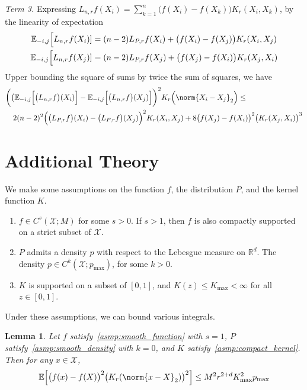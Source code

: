 \documentclass{article}
\newcommand{\Reals}{\mathbb{R}}
\newcommand{\1}{\mathbf{1}}
\newcommand{\Xset}{\mathcal{X}}
\newcommand{\Ebb}{\mathbb{E}}
\theoremstyle{alden}
\theoremstyle{aldenthm}
\newtheorem{lemma}{Lemma}
\theoremstyle{definition}
\theoremstyle{remark}
\begin{document}
\textit{Term 3.}
Expressing $L_{n,r}f(X_i) = \sum_{k = 1}^{n} \bigl(f(X_i) - f(X_k)\bigr)K_r(X_i,X_k)$, by the linearity of expectation
\begin{align*}
\Ebb_{-i,j}\Bigl[L_{n,r}f(X_i)] & = (n - 2) L_{P,r}f(X_i) + \bigl(f(X_i) - f(X_j)\bigr)K_r(X_i,X_j) \\
\Ebb_{-i,j}\Bigl[L_{n,r}f(X_j)] & = (n - 2) L_{P,r}f(X_j) + \bigl(f(X_j) - f(X_i)\bigr)K_r(X_j,X_i)
\end{align*}
Upper bounding the square of sums by twice the sum of squares, we have
\begin{align*}
& \biggl(\bigl(\Ebb_{-i,j}\Bigl[\bigl(L_{n,r}f\bigr)(X_i) \Bigr] - \Ebb_{-i,j}\Bigl[\bigl(L_{n,r}f\bigr)(X_j)\Bigr]\biggr)^2 K_r\Bigl(\norm{X_i - X_j}_2\Bigr) \leq \\
&~~~ 2(n-2)^2\Bigl(\bigl(L_{P,r}f\bigr)(X_i) - \bigl(L_{P,r}f\bigr)(X_j)\Bigr)^2K_{r}(X_i,X_j) + 8 \bigl(f(X_j) - f(X_i)\bigr)^2 \bigl(K_r(X_j,X_i)\bigr)^3
\end{align*}
\section{Additional Theory}

We make some assumptions on the function $f$, the distribution $P$, and the kernel function $K$.

\begin{enumerate}[label=(A\arabic*)]
	\item 
	\label{asmp:smooth_function}
	$f \in C^{s}(\Xset;M)$ for some $s > 0$. If $s > 1$, then $f$ is also compactly supported on a strict subset of $\Xset$.
	
	\item 
	\label{asmp:smooth_density}
	$P$ admits a density $p$ with respect to the Lebesgue measure on $\Reals^d$. The density $p \in C^{k}(\Xset;p_{\max})$, for some $k > 0$.
	\item 
	\label{asmp:compact_kernel}
	$K$ is supported on a subset of $[0,1]$, and $K(z) \leq K_{\max} < \infty$ for all $z  \in [0,1]$.  
\end{enumerate}

Under these assumptions, we can bound various integrals.

\begin{lemma}
	\label{lem:expectation_1}
	Let $f$ satisfy~\ref{asmp:smooth_function} with $s = 1$, $P$ satisfy~\ref{asmp:smooth_density} with $k = 0$, and $K$ satisfy~\ref{asmp:compact_kernel}. Then for any $x \in \Xset$,
	\begin{equation*}
	\Ebb\Bigl[\bigl(f(x) - f(X)\bigr)^2 \bigl(K_r(\norm{x - X}_2)\bigr)^2\Bigr] \leq M^2 r^{2 + d} K_{\max}^2 p_{\max}
	\end{equation*}
\end{lemma}
\end{document}
